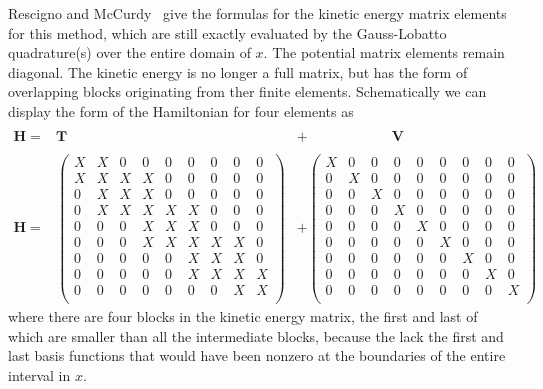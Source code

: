 \documentclass[aps,amssymb,superscriptaddress,floatfix]{revtex4}
\begin{document}
Rescigno and McCurdy~\cite{Rescigno_McCurdy2000}  give the formulas for the kinetic energy matrix elements for this method, which are still exactly evaluated by the Gauss-Lobatto quadrature(s) over the entire domain of $x$.  The potential matrix elements remain diagonal. The kinetic energy is no longer a full matrix, but has the form of overlapping blocks originating from ther finite elements. Schematically we can display the form of the Hamiltonian for four elements as
\begin{eqnarray}
\\
\mathbf{H} = &\mathbf{T} &+\qquad \qquad \qquad \mathbf{V} \\
\\
\mathbf{H} =&
 \begin{pmatrix} 
X&X&0&0&0&0&0&0&0 \\
 X&X&X&X&0&0&0&0&0 \\
0& X&X&X&0&0&0&0&0\\
0& X&X&X&X&X&0&0&0\\
0& 0&0&X&X&X&0&0&0\\
0& 0&0&X&X&X&X&X&0\\
0& 0&0&0&0&X&X&X&0\\
0& 0&0&0&0&X&X&X&X\\
0& 0&0&0&0&0&0&X&X\\
 \end{pmatrix}
 &+
 \begin{pmatrix}
X&0&0&0&0&0&0&0&0 \\
0&X&0&0&0&0&0&0&0 \\
0&0&X&0&0&0&0&0&0 \\
0&0&0&X&0&0&0&0&0 \\
0&0&0&0&X&0&0&0&0 \\
0&0&0&0&0&X&0&0&0 \\
0&0&0&0&0&0&X&0&0 \\
0&0&0&0&0&0&0&X&0 \\
0&0&0&0&0&0&0&0&X \\
 \end{pmatrix}
\end{eqnarray}
where there are four blocks in the kinetic energy matrix, the first and last of which are smaller than all the intermediate blocks, because the lack the first and last basis functions that would have been nonzero at the boundaries of the entire interval in $x$.
\end{document}
